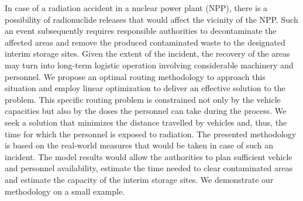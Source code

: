 
\begin{Abstrakt}
    In case of a radiation accident in a nuclear power plant (NPP), there is a possibility of radionuclide releases that would affect the vicinity of the NPP. Such an event subsequently requires responsible authorities to decontaminate the affected areas and remove the produced contaminated waste to the designated interim storage sites. Given the extent of the incident, the recovery of the areas may turn into long-term logistic operation involving considerable machinery and personnel. We propose an optimal routing methodology to approach this situation and employ linear optimization to deliver an effective solution to the problem. This specific routing problem is constrained not only by the vehicle capacities but also by the doses the personnel can take during the process. We seek a solution that minimizes the distance travelled by vehicles and, thus, the time for which the personnel is exposed to radiation. The presented methodology is based on the real-world measures that would be taken in case of such an incident. The model results would allow the authorities to plan sufficient vehicle and personnel availability, estimate the time needed to clear contaminated areas and estimate the capacity of the interim storage sites. We demonstrate our methodology on a small example.
\end{Abstrakt}



\clearpage